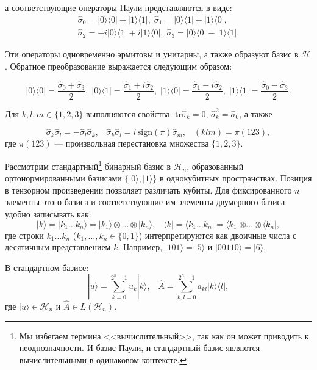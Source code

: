 \documentclass[a4paper]{report}
\begin{document}
\noindent а соответствующие операторы Паули представляются в виде:
\begin{align*}
    \hat{\sigma}_0 = |0\rangle\langle0| + |1\rangle\langle1|,\;
    \hat{\sigma}_1 = |0\rangle\langle1| + |1\rangle\langle0|,     \\
    \hat{\sigma}_2 = -i|0\rangle\langle1| + i|1\rangle\langle0|,\;
    \hat{\sigma}_3 = |0\rangle\langle0| - |1\rangle\langle1|.
\end{align*}

\noindent Эти операторы одновременно эрмитовы и унитарны, а также образуют базис в ${\mathcal{H}}$. Обратное преобразование выражается следующим образом:

$${
    |0\rangle\langle0| = \frac{\hat{\sigma}_0 + \hat{\sigma}_3}{2},\;
    |0\rangle\langle1| = \frac{\hat{\sigma}_1 + i\hat{\sigma}_2}{2},\;
    |1\rangle\langle0| = \frac{\hat{\sigma}_1 - i\hat{\sigma}_2}{2},\;
    |1\rangle\langle1| = \frac{\hat{\sigma}_0 - \hat{\sigma}_3}{2}.
}$$

Для ${k, l, m \in \{1,2,3\}}$ выполняются свойства:
${\mathrm{tr}\hat{\sigma}_k = 0}$,
${\hat{\sigma}^2_k = \hat{\sigma}_0}$, а также

\begin{equation}\label{eq2}
    \hat{\sigma}_k\hat{\sigma}_l = -\hat{\sigma}_l\hat{\sigma}_k, \;\;\;
    \hat{\sigma}_k\hat{\sigma}_l = i\,\mathrm{sign}(\pi)\hat{\sigma}_m, \;\;\;
    (klm) = \pi(123),
\end{equation}
где ${\pi(123)}$ — произвольная перестановка множества ${\{1,2,3\}}$.

Рассмотрим стандартный\footnote[1]{Мы избегаем термина <<вычислительный>>, так как он может приводить к неоднозначности. И базис Паули, и стандартный базис являются вычислительными в одинаковом контексте.} бинарный базис в ${\mathcal{H}_n}$, образованный ортонормированными базисами ${\{|0\rangle,|1\rangle\}}$ в однокубитных пространствах. Позиция в тензорном произведении позволяет различать кубиты. Для фиксированного ${n}$ элементы этого базиса и соответствующие им элементы двумерного базиса удобно записывать как:
$${
    |k\rangle = |k_1\ldots k_n\rangle = |k_1\rangle \otimes \ldots \otimes |k_n\rangle,\;\;\;
    \langle k| = \langle k_1\ldots k_n| = \langle k_1|\otimes\ldots\otimes\langle k_n|,
}$$
\noindent где строки ${k_1\ldots k_n}$ (${k_1,\ldots,k_n\in\{0, 1\}}$) интерпретируются как двоичные числа с десятичным представлением ${k}$. Например, ${|101\rangle = |5\rangle}$ и ${|00110\rangle = |6\rangle}$.

В стандартном базисе:
$${
    |u\rangle = \sum_{k=0}^{2^n - 1} u_k |k\rangle, \;\;\;
    \hat{A} = \sum_{k,l=0}^{2^n - 1} a_{kl} |k\rangle\langle l|,
}$$
\noindent где ${|u\rangle \in \mathcal{H}_n}$ и ${\hat{A} \in L(\mathcal{H}_n)}$.
\end{document}

